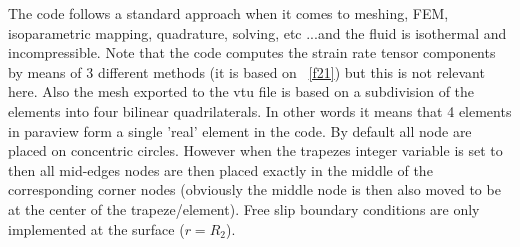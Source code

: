 The code follows a standard approach when it comes to meshing, FEM, isoparametric
mapping, quadrature, solving, etc ...and the fluid is isothermal and incompressible.
Note that the code computes the strain rate tensor components by means of 3 different 
methods (it is based on \stone~\ref{f21}) but this is not relevant here.
Also the mesh exported to the vtu file is based on a subdivision of the elements into 
four bilinear quadrilaterals. In other words it means that 4 elements in paraview 
form a single 'real' element in the code.
By default all node are placed on concentric circles. However when the {\python trapezes}
integer variable is set to {} then all mid-edges nodes are then placed exactly 
in the middle of the corresponding corner nodes (obviously the middle node is then also 
moved to be at the center of the trapeze/element).
Free slip boundary conditions are only implemented at the surface ($r=R_2$).

